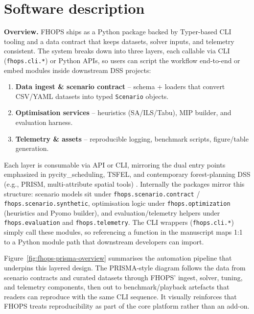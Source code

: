 \section{Software description}
\label{sec:software-description}

\textbf{Overview.} FHOPS ships as a Python package backed by Typer-based CLI tooling and a data contract that keeps datasets, solver inputs, and telemetry consistent. The system breaks down into three layers, each callable via CLI (\texttt{fhops.cli.*}) or Python APIs, so users can script the workflow end-to-end or embed modules inside downstream DSS projects:

\begin{enumerate}
  \item \textbf{Data ingest \& scenario contract} – schema + loaders that convert CSV/YAML datasets into typed \texttt{Scenario} objects.
  \item \textbf{Optimisation services} – heuristics (SA/ILS/Tabu), MIP builder, and evaluation harness.
  \item \textbf{Telemetry \& assets} – reproducible logging, benchmark scripts, figure/table generation.
\end{enumerate}

Each layer is consumable via API or CLI, mirroring the dual entry points emphasized in pycity\_scheduling, TSFEL, and contemporary forest-planning DSS (e.g., PRISM, multi-attribute spatial tools) \cite{nguyen2022prism,kuhmaier2010dss}. Internally the packages mirror this structure: scenario models sit under \texttt{fhops.scenario.contract} / \texttt{fhops.scenario.synthetic}, optimisation logic under \texttt{fhops.optimization} (heuristics and Pyomo builder), and evaluation/telemetry helpers under \texttt{fhops.evaluation} and \texttt{fhops.telemetry}. The CLI wrappers (\texttt{fhops.cli.*}) simply call these modules, so referencing a function in the manuscript maps 1:1 to a Python module path that downstream developers can import.

Figure~\ref{fig:fhops-prisma-overview} summarises the automation pipeline that underpins this layered design. The PRISMA-style diagram follows the data from scenario contracts and curated datasets through FHOPS’ ingest, solver, tuning, and telemetry components, then out to benchmark/playback artefacts that readers can reproduce with the same CLI sequence. It visually reinforces that FHOPS treats reproducibility as part of the core platform rather than an add-on.

